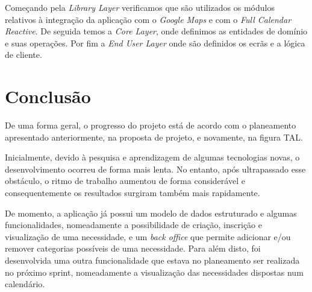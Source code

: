 \documentclass[a4paper,openright,11pt]{report}
\begin{document}
Começando pela \textit{Library Layer} verificamos que são utilizados os módulos relativos à integração da aplicação 
com o \textit{Google Maps} e com o \textit{Full Calendar Reactive}. De seguida temos a \textit{ Core Layer}, 
onde definimos as entidades de domínio e suas operações. Por fim a \textit{ End User Layer} onde são definidos 
os ecrãs e a lógica de cliente. 

\section*{Conclusão}\label{sec:conclusion}

De uma forma geral, o progresso do projeto está de acordo com o planeamento apresentado anteriormente, na proposta de projeto, e novamente, na figura TAL.

Inicialmente, devido à pesquisa e aprendizagem de algumas tecnologias novas, o desenvolvimento ocorreu de forma mais lenta. 
No entanto, após ultrapassado esse obstáculo, o ritmo de trabalho aumentou de forma considerável e consequentemente os resultados surgiram também mais rapidamente. 

De momento, a aplicação já possui um modelo de dados estruturado e algumas funcionalidades, nomeadamente a possibilidade de criação, 
inscrição e visualização de uma necessidade, e um \textit{back office} que permite adicionar e/ou remover categorias possíveis de uma necessidade. 
Para além disto, foi desenvolvida uma outra funcionalidade que estava no planeamento ser realizada no próximo sprint, nomeadamente a visualização das necessidades dispostas num calendário.
\end{document}
